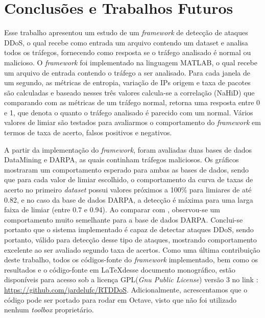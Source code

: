 \chapter[Conclusões e Trabalhos Futuros]{Conclusões e Trabalhos Futuros}
Esse trabalho apresentou um estudo de um \textit{framework} de detecção de ataques DDoS, o qual recebe como entrada um arquivo contendo um dataset e analisa todos os tráfegos, fornecendo como resposta se o tráfego analisado é normal ou malicioso. O \textit{framework} foi implementado na linguagem MATLAB, o qual recebe um arquivo de entrada contendo o tráfego a ser analisado. Para cada janela de um segundo, as métricas de entropia, variação de IPs origem e taxa de pacotes são calculadas e baseado nesses três valores  calcula-se a correlação (NaHiD) que comparando com as métricas de um tráfego normal, retorna uma resposta entre 0 e 1, que denota o quanto o tráfego analisado é parecido com um normal. Vários valores de limiar são testados para avaliarmos o comportamento do \textit{framework} em termos de taxa de acerto, falsos positivos e negativos.

A partir da implementação do \textit{framework}, foram avaliadas duas bases de dados DataMining e DARPA, as quais continham tráfegos maliciosos. Os gráficos mostraram um comportamento esperado para ambas as bases de dados, sendo que para cada valor de limiar escolhido, o comportamento da curva de taxas de acerto no primeiro \textit{dataset} possui valores próximos a 100\% para limiares de até 0.82, e no caso da base de dados DARPA, a detecção é máxima para uma larga faixa de limiar (entre 0.7 e 0.94). Ao comparar com \cite{HOQUE201748}, observou-se um comportamento muito semelhante para a base de dados DARPA. Conclui-se portanto que o sistema implementado é capaz de detectar ataques DDoS, sendo portanto, válido para detecção desse tipo de ataques, mostrando comportamento excelente ao ser avaliado segundo taxa de acertos. Como uma última contribuição deste trabalho, todos os códigos-fonte do \textit{framework} implementado, bem como os resultados e o código-fonte em \LaTeX desse documento monográfico, estão disponíveis para acesso sob a licença GPL(\textit{Gnu Public License}) versão 3 no link : \url{https://github.com/jardelufc/RTDDoS}. Adicionalmente, acrescentamos que o código pode ser portado para rodar em Octave, visto que não foi utilizado nenhum \textit{toolbox} proprietário.   

